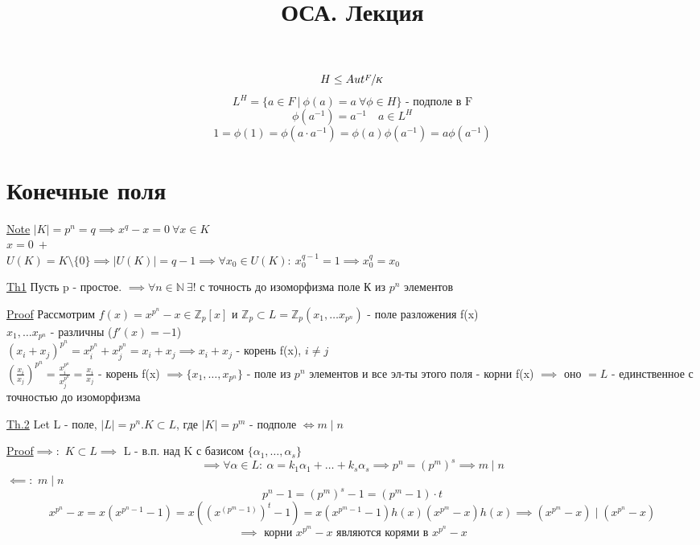 \documentclass[a4paper]{article}
\begin{document}
\title{ОСА. Лекция}
\maketitle

\[
    H \leq Aut \sfrac{F}{K} 
\]
\[
    L^{H} = \{ a \in F \ | \ \phi(a) = a \ \forall \phi \in H\} \text{ - подполе в F}
\]
\[
    \phi(a^{-1}) = a^{-1} \quad a \in L^{H}
\]
\[
    1 = \phi(1) = \phi(a \cdot a^{-1}) = \phi(a) \phi(a^{-1}) = a \phi(a^{-1})
\]

\section*{\centering Конечные поля}

\begin{tcolorbox}
\underline{Note} $ |K| = p^{n} = q \implies x^{q} - x = 0\ \forall x \in K $ \\
$ x = 0 \ + $ \\
$ U(K) = K \setminus \{ 0 \} \implies |U(K)| = q - 1 \implies \forall x_0 \in 
U(K): \ x_0^{q - 1} = 1 \implies x_0^{q} = x_0$ 
\end{tcolorbox}

\begin{tcolorbox}
\underline{Th1} Пусть p - простое. $ \implies \forall n \in \mathbb{N} \ \exists ! $ 
с точность до изоморфизма поле К из $ p^{n} $ элементов

\underline{Proof} Рассмотрим $ f(x) = x^{p^{n}} - x \in \mathbb{Z}_p[x] $ и
$ \mathbb{Z}_p \subset L = \mathbb{Z}_p(x_1, \dots x_{p^{n}}) $ - поле разложения 
f(x)\\
$ x_1, \dots x_{p^{n}} $ - различны ($ f'(x) = -1 $)\\
$ (x_i + x_j)^{p^{n}} = x_i^{p^{n}} + x_j^{p^{n}} = x_i + x_j \implies x_i +
x_j $ - корень f(x), $ i \neq j $ \\
$ \left(\frac{x_i}{x_j}\right)^{p^{n}} = \frac{x_i^{p^{n}}}{x_j^{p^{n}}} = 
\frac{x_i}{x_j}  $ - корень f(x) $ \implies \{ x_1, \dots , x_{p^{n}} \} $ - 
поле из $ p^{n} $ элементов и все эл-ты этого поля - корни f(x) $ \implies $ 
оно $ = L $ - единственное с точностью до изоморфизма 
\end{tcolorbox}

\begin{tcolorbox}
\underline{Th.2} Let L - поле, $ |L| = p^{n}. K \subset L $, где $ |K| = p^{m} $ 
- подполе $ \iff m \mid n $ 

\underline{Proof}$ \implies: $ $ K \subset L \implies $ L - в.п. над K с базисом
$ \{ \alpha_1, \dots, \alpha_s \} $ 
\[
    \implies \forall \alpha \in L: \ \alpha = k_1\alpha_1 + \dots + k_s \alpha_s
    \implies p^{n} = (p^{m})^{s} \implies m \mid n
\]
$ \impliedby: $ $ m \mid n $ 
\[
    p^{n} - 1 = (p^{m})^{s}- 1 = (p^{m} - 1) \cdot t
\]
\[
    x^{p^{n}} - x = x(x^{p^{n} - 1} - 1) = x((x^{(p^{m}-1)})^{t} - 1) =
    x(x^{p^{m} - 1} - 1)h(x) (x^{p^{m}} - x) h(x) \implies (x^{p^{m}} - x)
    \mid (x^{p^{n}} - x)
\]
\[
    \implies \text{ корни } x^{p^{m}} - x \text{ являются корями в } x^{p^{n}} - x
\]
\end{tcolorbox}
\end{document}
